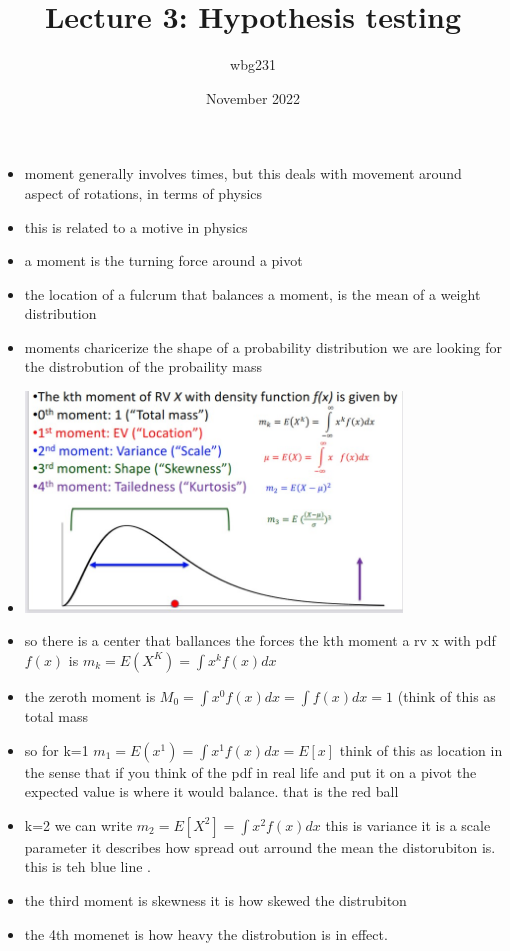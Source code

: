 \documentclass{article}
\title{Lecture 3: Hypothesis testing }
\author{wbg231 }
\date{November 2022}
\begin{document}
\maketitle
\begin{itemize}
\section{Finishing up last lecture }
\subsection{Moments}
    \item moment generally involves times, but this deals with movement around aspect of rotations, in terms of physics
    \item this is related to a motive in physics
    \item a moment is the turning force around a pivot
    \item the location of a fulcrum that balances a moment, is the mean of a weight distribution
    \item moments charicerize the shape of a probability distribution 
    \itme we are looking for the distrobution of the probaility mass   \item \includegraphics[width=10cm]{Final_Review/lecture_3/lecture 2 example 1 .jpg}

    \item so there is a center that ballances the forces
    \itme the kth moment a rv x with pdf $f(x)$ is $m_k=E(X^K)=\int x^kf(x)dx$
    \item the zeroth moment is $M_0=\int x^0f(x)dx=\int f(x)dx=1$ (think of this as total mass 
    \item so for k=1 $m_1=E(x^1)=\int x^1f(x)dx=E[x]$
    think of this as location in the sense that if you think of the pdf in real life and put it on a pivot the expected value is where it would balance. that is the red ball   
    \item k=2 we can write $m_2=E[X^2]=\int x^2f(x)dx$ this is variance it is a scale parameter it describes how spread out arround the mean the distorubiton is. this is teh blue line 
    .\item  the third moment is skewness it is how skewed the distrubiton 
    \item the 4th momenet is how heavy the distrobution is in effect.

\end{itemize}
\end{document}
